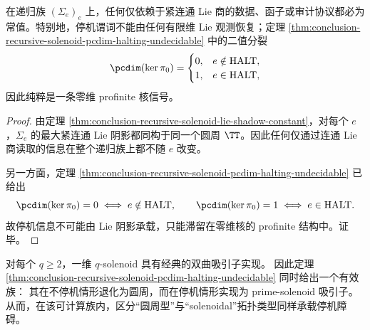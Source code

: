 \begin{corollary}[停机信息完全滞留于零维核]\label{cor:conclusion-recursive-solenoid-halting-zero-dimensional-kernel-only}
在递归族 \((\Sigma_e)_e\) 上，任何仅依赖于紧连通 Lie 商的数据、函子或审计协议都必为常值。特别地，停机谓词不能由任何有限维 Lie 观测恢复；定理 \ref{thm:conclusion-recursive-solenoid-pcdim-halting-undecidable} 中的二值分裂
\[
\pcdim(\ker\pi_0)=
\begin{cases}
0, & e\notin \mathrm{HALT},\\
1, & e\in \mathrm{HALT},
\end{cases}
\]
因此纯粹是一条零维 profinite 核信号。
\end{corollary}
\begin{proof}
由定理 \ref{thm:conclusion-recursive-solenoid-lie-shadow-constant}，对每个 \(e\)，\(\Sigma_e\) 的最大紧连通 Lie 阴影都同构于同一个圆周 \(\TT\)。因此任何仅通过连通 Lie 商读取的信息在整个递归族上都不随 \(e\) 改变。

另一方面，定理 \ref{thm:conclusion-recursive-solenoid-pcdim-halting-undecidable} 已给出
\[
\pcdim(\ker\pi_0)=0 \iff e\notin\mathrm{HALT},
\qquad
\pcdim(\ker\pi_0)=1 \iff e\in\mathrm{HALT}.
\]
故停机信息不可能由 Lie 阴影承载，只能滞留在零维核的 profinite 结构中。证毕。
\end{proof}

\begin{remark}\label{rem:conclusion-recursive-solenoid-attractor-undecidable}
对每个 \(q\ge 2\)，一维 \(q\)-solenoid 具有经典的双曲吸引子实现。
因此定理 \ref{thm:conclusion-recursive-solenoid-pcdim-halting-undecidable} 同时给出一个有效族：
其在不停机情形退化为圆周，而在停机情形实现为 prime-solenoid 吸引子。
从而，在该可计算族内，区分“圆周型”与“solenoidal”拓扑类型同样承载停机障碍。
\end{remark}
